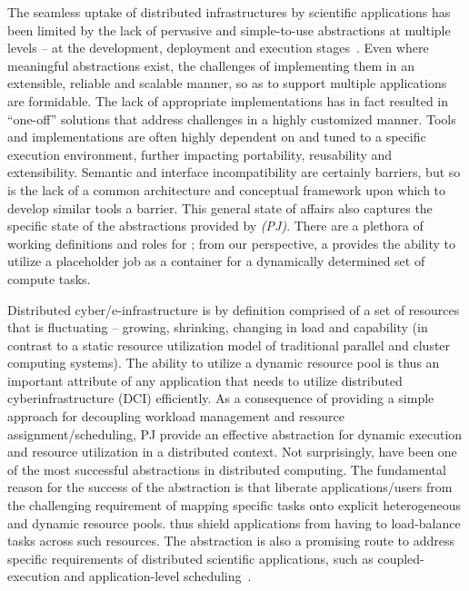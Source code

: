 \documentclass[conference]{IEEEtran}
\begin{document}
The seamless uptake of distributed infrastructures by scientific
applications has been limited by the lack of pervasive and
simple-to-use abstractions at multiple levels -- at the development,
deployment and execution stages~\cite{dpagrid2009}.  Even where meaningful abstractions
exist, the challenges of implementing them in an extensible, reliable
and scalable manner, so as to support multiple applications are
formidable.  The lack of appropriate implementations has in fact
resulted in ``one-off'' solutions that address challenges in a highly
customized manner.  Tools and implementations are often highly
dependent on and tuned to a specific execution environment, further
impacting portability, reusability and extensibility.  Semantic and
interface incompatibility are certainly barriers, but so is the lack
of a common architecture and conceptual framework upon which to
develop similar tools a barrier.  This general state of affairs also
captures the specific state of the abstractions provided by {\it
  \pilotjobs (PJ)}.  There are a plethora of working definitions and
roles for \pilotjobs; from our perspective, a \pilotjob provides the
ability to utilize a placeholder job as a container for a dynamically
determined set of compute tasks.


Distributed cyber/e-infrastructure is by definition comprised of a set
of resources that is fluctuating -- growing, shrinking, changing in
load and capability (in contrast to a static resource utilization
model of traditional parallel and cluster computing systems).  The
ability to utilize a dynamic resource pool is thus an important
attribute of any application that needs to utilize distributed
cyberinfrastructure (DCI) efficiently. As a consequence of providing a
simple approach for decoupling workload management and resource
assignment/scheduling, PJ provide an effective abstraction for dynamic
execution and resource utilization in a distributed context.  Not
surprisingly, \pilotjobs have been one of the most successful
abstractions in distributed computing.  The fundamental reason for the
success of the \pilotjob abstraction is that \pilotjobs liberate
applications/users from the challenging requirement of mapping
specific tasks onto explicit heterogeneous and dynamic resource pools.
\pilotjobs thus shield applications from having to load-balance tasks
across such resources.  The \pilotjob abstraction is also a promising
route to address specific requirements of distributed scientific
applications, such as coupled-execution and application-level
scheduling~\cite{ko-efficient,DBLP:conf/hpdc/KimHMAJ10}.
\end{document}
